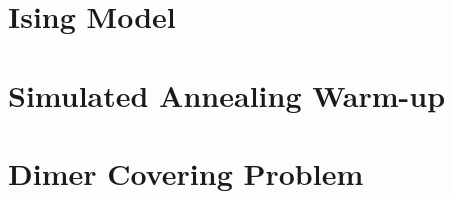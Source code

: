 \documentclass{article}
\begin{document}
\section{Ising Model}

\section{Simulated Annealing Warm-up}

\section{Dimer Covering Problem}
\end{document}
